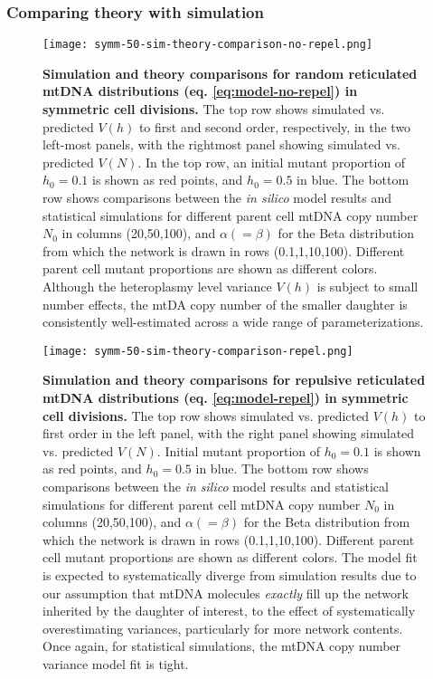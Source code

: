\documentclass{article}
\begin{document}
\begin{appendices}
\subsubsection{Comparing theory with simulation}
\begin{figure}[!ht]
        \centering \texttt{[image: symm-50-sim-theory-comparison-no-repel.png]}
        \caption{\textbf{Simulation and theory comparisons for random reticulated mtDNA distributions (eq. \ref{eq:model-no-repel}) in symmetric cell divisions.} The top row shows simulated vs. predicted $V(h)$ to first and second order, respectively, in the two left-most panels, with the rightmost panel showing simulated vs. predicted $V(N)$. In the top row, an initial mutant proportion of $h_0=0.1$ is shown as red points, and $h_0=0.5$ in blue. The bottom row shows comparisons between the \textit{in silico} model results and statistical simulations for different parent cell mtDNA copy number $N_0$ in columns (20,50,100), and $\alpha(=\beta)$ for the Beta distribution from which the network is drawn in rows (0.1,1,10,100). Different parent cell mutant proportions are shown as different colors. Although the heteroplasmy level variance $V(h)$ is subject to small number effects, the mtDA copy number of the smaller daughter is consistently well-estimated across a wide range of parameterizations.}
\end{figure}\label{fig:app-sim-theory-no-repel}
\begin{figure}[!ht]
        \centering \texttt{[image: symm-50-sim-theory-comparison-repel.png]}
        \caption{\textbf{Simulation and theory comparisons for repulsive reticulated mtDNA distributions (eq. \ref{eq:model-repel}) in symmetric cell divisions.} The top row shows simulated vs. predicted $V(h)$ to first order in the left panel, with the right panel showing simulated vs. predicted $V(N)$. Initial mutant proportion of $h_0=0.1$ is shown as red points, and $h_0=0.5$ in blue. The bottom row shows comparisons between the \textit{in silico} model results and statistical simulations for different parent cell mtDNA copy number $N_0$ in columns (20,50,100), and $\alpha(=\beta)$ for the Beta distribution from which the network is drawn in rows (0.1,1,10,100). Different parent cell mutant proportions are shown as different colors. The model fit is expected to systematically diverge from simulation results due to our assumption that mtDNA molecules \textit{exactly} fill up the network inherited by the daughter of interest, to the effect of systematically overestimating variances, particularly for more network contents. Once again, for statistical simulations, the mtDNA copy number variance model fit is tight.}\label{fig:app-sim-theory-repel}

\end{figure}
\end{appendices}
\end{document}
